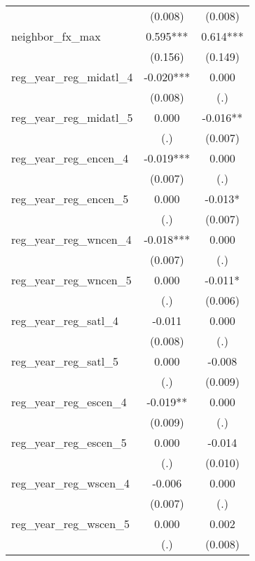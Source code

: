 \begin{table}[htbp]
\begin{tabular}{l*{2}{c}}
                    &  (0.008)   &  (0.008)   \\
\addlinespace
neighbor\_fx\_max     &    0.595***&    0.614***\\
                    &  (0.156)   &  (0.149)   \\
\addlinespace
reg\_year\_reg\_midatl\_4&   -0.020***&    0.000   \\
                    &  (0.008)   &      (.)   \\
\addlinespace
reg\_year\_reg\_midatl\_5&    0.000   &   -0.016** \\
                    &      (.)   &  (0.007)   \\
\addlinespace
reg\_year\_reg\_encen\_4&   -0.019***&    0.000   \\
                    &  (0.007)   &      (.)   \\
\addlinespace
reg\_year\_reg\_encen\_5&    0.000   &   -0.013*  \\
                    &      (.)   &  (0.007)   \\
\addlinespace
reg\_year\_reg\_wncen\_4&   -0.018***&    0.000   \\
                    &  (0.007)   &      (.)   \\
\addlinespace
reg\_year\_reg\_wncen\_5&    0.000   &   -0.011*  \\
                    &      (.)   &  (0.006)   \\
\addlinespace
reg\_year\_reg\_satl\_4 &   -0.011   &    0.000   \\
                    &  (0.008)   &      (.)   \\
\addlinespace
reg\_year\_reg\_satl\_5 &    0.000   &   -0.008   \\
                    &      (.)   &  (0.009)   \\
\addlinespace
reg\_year\_reg\_escen\_4&   -0.019** &    0.000   \\
                    &  (0.009)   &      (.)   \\
\addlinespace
reg\_year\_reg\_escen\_5&    0.000   &   -0.014   \\
                    &      (.)   &  (0.010)   \\
\addlinespace
reg\_year\_reg\_wscen\_4&   -0.006   &    0.000   \\
                    &  (0.007)   &      (.)   \\
\addlinespace
reg\_year\_reg\_wscen\_5&    0.000   &    0.002   \\
                    &      (.)   &  (0.008)   \\

\end{tabular}
\end{table}

